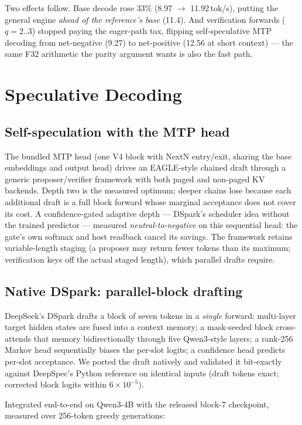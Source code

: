 \documentclass[11pt]{article}
\begin{document}
Two effects follow. Base decode rose 33\% (8.97 $\rightarrow$
11.92\,tok/s), putting the general engine \emph{ahead of the reference's
base} (11.4). And verification forwards ($q{=}2..3$) stopped paying the
eager-path tax, flipping self-speculative MTP decoding from net-negative
(9.27) to net-positive (12.56 at short context) --- the same F32
arithmetic the parity argument wants is also the fast path.

\section{Speculative Decoding}

\subsection{Self-speculation with the MTP head}

The bundled MTP head (one V4 block with NextN entry/exit, sharing the
base embeddings and output head) drives an EAGLE-style chained draft
through a generic proposer/verifier framework with both paged and
non-paged KV backends. Depth two is the measured optimum; deeper chains
lose because each additional draft is a full block forward whose marginal
acceptance does not cover its cost. A confidence-gated adaptive depth ---
DSpark's scheduler idea without the trained predictor --- measured
\emph{neutral-to-negative} on this sequential head: the gate's own
softmax and host readback cancel its savings. The framework retains
variable-length staging (a proposer may return fewer tokens than its
maximum; verification keys off the actual staged length), which parallel
drafts require.

\subsection{Native DSpark: parallel-block drafting}

DeepSeek's DSpark drafts a block of seven tokens in a \emph{single}
forward: multi-layer target hidden states are fused into a context
memory; a mask-seeded block cross-attends that memory bidirectionally
through five Qwen3-style layers; a rank-256 Markov head sequentially
biases the per-slot logits; a confidence head predicts per-slot
acceptance. We ported the draft natively and validated it bit-exactly
against DeepSpec's Python reference on identical inputs (draft tokens
exact; corrected block logits within $6\times10^{-5}$).

Integrated end-to-end on Qwen3-4B with the released block-7 checkpoint,
measured over 256-token greedy generations:
\end{document}
